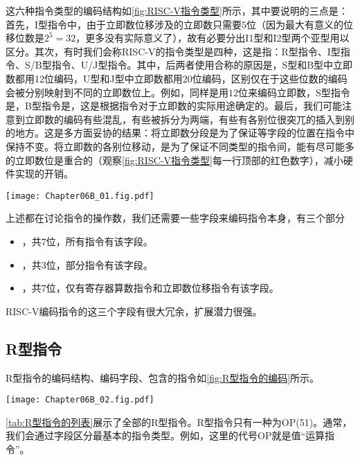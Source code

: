 这六种指令类型的编码结构如\cref{fig:RISC-V指令类型}所示，其中要说明的三点是：首先，I型指令中，由于立即数位移涉及的立即数只需要$5$位（因为最大有意义的位移位数是$2^5=32$，更多没有实际意义了），故有必要分出I1型和I2型两个亚型用以区分。其次，有时我们会称RISC-V的指令类型是四种，这是指：R型指令、I型指令、S/B型指令、U/J型指令。其中，后两者使用合称的原因是，S型和B型中立即数都用12位编码，U型和J型中立即数都用20位编码，区别仅在于这些位数的编码会被分别映射到不同的立即数位上。例如，同样是用$12$位来编码立即数，S型指令是，B型指令是，这是根据指令对于立即数的实际用途确定的。最后，我们可能注意到立即数的编码有些混乱，有些被拆分为两端，有些有各别位很突兀的插入到别的地方。这是多方面妥协的结果：将立即数分段是为了保证等字段的位置在指令中保持不变。将立即数的各别位移动，是为了保证不同类型的指令间，能有尽可能多的立即数位是重合的（观察\cref{fig:RISC-V指令类型}每一行顶部的红色数字），减小硬件实现的开销。

\begin{Figure}
    \texttt{[image: Chapter06B\_01.fig.pdf]}
\end{Figure}

上述都在讨论指令的操作数，我们还需要一些字段来编码指令本身，有三个部分
\begin{itemize}
    \item {}，共$7$位，所有指令有该字段。
    \item {}，共$3$位，部分指令有该字段。
    \item {}，共$7$位，仅有寄存器算数指令和立即数位移指令有该字段。
\end{itemize}

RISC-V编码指令的这三个字段有很大冗余，扩展潜力很强。

\subsection{R型指令}

R型指令的编码结构、编码字段、包含的指令如\cref{fig:R型指令的编码}所示。
\begin{Figure}[R型指令的编码]
    \texttt{[image: Chapter06B\_02.fig.pdf]}
\end{Figure}

\cref{tab:R型指令的列表}展示了全部的R型指令。R型指令只有一种为OP(51)。通常，我们会通过字段区分最基本的指令类型。例如，这里的代号OP就是值“运算指令”。

